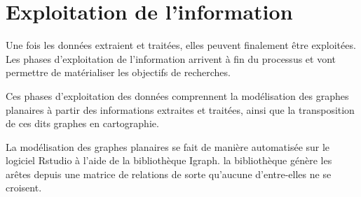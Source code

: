 \section{Exploitation de l'information}
Une fois les données extraient et traitées, elles peuvent finalement être exploitées.
Les phases d'exploitation de l'information  arrivent à fin du processus et vont permettre de matérialiser les objectifs de recherches.

Ces phases d'exploitation des données comprennent la modélisation des graphes planaires à partir des informations extraites et traitées, ainsi que la transposition de ces  dits graphes en cartographie.

La modélisation des graphes planaires se fait de manière automatisée sur le logiciel Rstudio à l'aide de la bibliothèque Igraph. la bibliothèque génère les arêtes depuis une matrice de relations de sorte qu'aucune d'entre-elles ne se croisent. 
